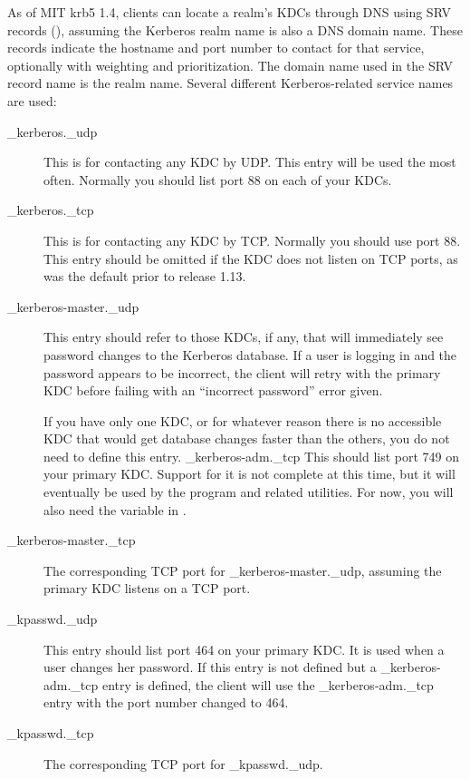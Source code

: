 \documentclass[letterpaper,10pt,english]{sphinxmanual}
\begin{document}
As of MIT krb5 1.4, clients can locate a realm’s KDCs through DNS
using SRV records (), assuming the Kerberos realm name is
also a DNS domain name.  These records indicate the hostname and port
number to contact for that service, optionally with weighting and
prioritization.  The domain name used in the SRV record name is the
realm name.  Several different Kerberos-related service names are
used:
\begin{description}
\item[{\_kerberos.\_udp}] \leavevmode
This is for contacting any KDC by UDP.  This entry will be used
the most often.  Normally you should list port 88 on each of your
KDCs.

\item[{\_kerberos.\_tcp}] \leavevmode
This is for contacting any KDC by TCP.  Normally you should use
port 88.  This entry should be omitted if the KDC does not listen
on TCP ports, as was the default prior to release 1.13.

\item[{\_kerberos-master.\_udp}] \leavevmode
This entry should refer to those KDCs, if any, that will
immediately see password changes to the Kerberos database.  If a
user is logging in and the password appears to be incorrect, the
client will retry with the primary KDC before failing with an
“incorrect password” error given.

If you have only one KDC, or for whatever reason there is no
accessible KDC that would get database changes faster than the
others, you do not need to define this entry.  \_kerberos-adm.\_tcp
This should list port 749 on your primary KDC.  Support for it is
not complete at this time, but it will eventually be used by the
{\hyperref[\detokenize{admin/admin_commands/kadmin_local:kadmin-1}]{}} program and related utilities.  For now, you will
also need the  variable in {\hyperref[\detokenize{admin/conf_files/krb5_conf:krb5-conf-5}]{}}.

\item[{\_kerberos-master.\_tcp}] \leavevmode
The corresponding TCP port for \_kerberos-master.\_udp, assuming the
primary KDC listens on a TCP port.

\item[{\_kpasswd.\_udp}] \leavevmode
This entry should list port 464 on your primary KDC.  It is used
when a user changes her password.  If this entry is not defined
but a \_kerberos-adm.\_tcp entry is defined, the client will use the
\_kerberos-adm.\_tcp entry with the port number changed to 464.

\item[{\_kpasswd.\_tcp}] \leavevmode
The corresponding TCP port for \_kpasswd.\_udp.

\end{description}
\end{document}

